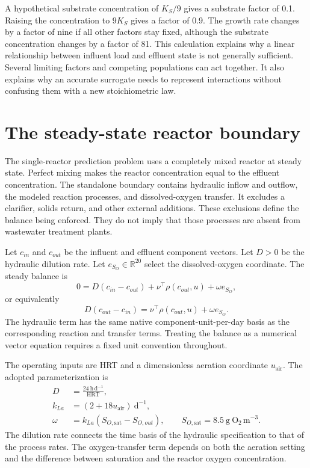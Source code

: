 A hypothetical substrate concentration of $K_S/9$ gives a substrate factor of 0.1. Raising the concentration to $9K_S$ gives a factor of 0.9. The growth rate changes by a factor of nine if all other factors stay fixed, although the substrate concentration changes by a factor of 81. This calculation explains why a linear relationship between influent load and effluent state is not generally sufficient. Several limiting factors and competing populations can act together. It also explains why an accurate surrogate needs to represent interactions without confusing them with a new stoichiometric law.

\section{The steady-state reactor boundary}

The single-reactor prediction problem uses a completely mixed reactor at steady state. Perfect mixing makes the reactor concentration equal to the effluent concentration. The standalone boundary contains hydraulic inflow and outflow, the modeled reaction processes, and dissolved-oxygen transfer. It excludes a clarifier, solids return, and other external additions. These exclusions define the balance being enforced. They do not imply that those processes are absent from wastewater treatment plants.

Let $c_{in}$ and $c_{out}$ be the influent and effluent component vectors. Let $D>0$ be the hydraulic dilution rate. Let $e_{S_O}\in\mathbb{R}^{20}$ select the dissolved-oxygen coordinate. The steady balance is
\begin{equation}
0=D(c_{in}-c_{out})+\nu^\top\rho(c_{out},u)+\omega e_{S_O},
\label{eq:reactor_steady_balance}
\end{equation}
or equivalently
\begin{equation}
D(c_{out}-c_{in})=\nu^\top\rho(c_{out},u)+\omega e_{S_O}.
\label{eq:reactor_steady_difference}
\end{equation}
The hydraulic term has the same native component-unit-per-day basis as the corresponding reaction and transfer terms. Treating the balance as a numerical vector equation requires a fixed unit convention throughout.

The operating inputs are HRT and a dimensionless aeration coordinate $u_{\mathrm{air}}$. The adopted parameterization is
\begin{align}
D&=\frac{24\ \mathrm{h\,d}^{-1}}{\mathrm{HRT}},\label{eq:reactor_dilution}\\
k_{La}&=(2+18u_{\mathrm{air}})\ \mathrm{d}^{-1},\label{eq:reactor_transfer_coefficient}\\
\omega&=k_{La}(S_{O,\mathrm{sat}}-S_{O,out}),\qquad
S_{O,\mathrm{sat}}=8.5\ \mathrm{g\ O_2\,m}^{-3}.
\label{eq:reactor_oxygen_transfer}
\end{align}
The dilution rate connects the time basis of the hydraulic specification to that of the process rates. The oxygen-transfer term depends on both the aeration setting and the difference between saturation and the reactor oxygen concentration.

